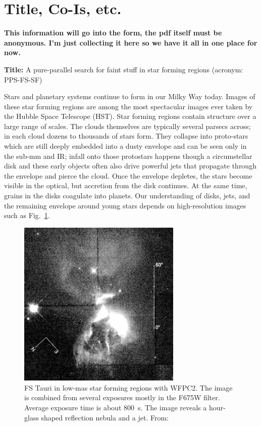 \documentclass[12pt]{article}
\begin{document}
\section{Title, Co-Is, etc.}
\textbf{This information will go into the form, the pdf itself must be anonymous. I'm just collecting it here so we have it all in one place for now.}

\textbf{Title:} A pure-parallel search for faint stuff in star forming regions (acronym: PPS-FS-SF)

\pagebreak
%
%
\justification          %
Stars and planetary systems continue to form in our Milky Way today. Images of these star forming regions are among the most spectacular images ever taken by the Hubble Space Telescope (HST). Star forming regions contain structure over a large range of scales. The clouds themselves are typically several parsecs across; in each cloud dozens to thousands of stars form. They collapse into proto-stars which are still deeply embedded into a dusty envelope and can be seen only in the sub-mm and IR; infall onto those protostars happens though a circumstellar disk and these early objects often also drive powerful jets that propagate through the envelope and pierce the cloud. Once the envelope depletes, the stars become visible in the optical, but accretion from the disk continues. At the same time, grains in the disks coagulate into planets. Our understanding of disks, jets, and the remaining envelope around young stars depends on high-resolution images such as Fig.~\ref{fig:krist}.


\begin{figure}
    \centering
    \includegraphics[height=8cm]{Krist98.png}
    \caption{FS Tauri in low-mas star forming regions with WFPC2. The image is combined from several exposures mostly in the F675W filter. Average exposure time is about 800~s. The image reveals a hour-glass shaped reflection nebula and a jet. From: \citet{1998ApJ...501..841K}}
    \label{fig:krist}
\end{figure}
\end{document}
